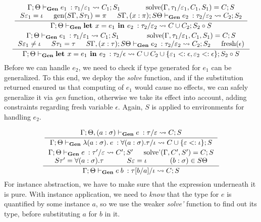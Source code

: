 \documentclass[declaration,shortabstract]{iithesis}
\theoremstyle{definition} \newtheorem{definition}{Definition}[section]
\newcommand{\gens}[6][\Gamma;\Theta]{\ensuremath{{{#1} \vdash_\textbf{Gen} {#2} \: : {#3}/{#4}} \rightsquigarrow {#5};{#6}}}
\newcommand{\lam}[1][x]{\ensuremath{\lambda #1.\:}}
\newcommand{\fresh}[1]{\ensuremath{\operatorname{fresh}({#1})}}
\begin{document}
\begin{gather*}
\inference{
    \gens{e_1}{\tau_1}{\varepsilon_1}{C_1}{S_1} &
    \operatorname{solve}(\Gamma,\tau_1/\varepsilon_1, C_1, S_1) =  C; S \\
    S \varepsilon_1 = \iota &
    \operatorname{gen}(S\Gamma, S\tau_1) = \pi &
    \gens[S\Gamma,(x:\pi);S\Theta]{e_2}{\tau_2}{\varepsilon_2}{C_2}{S_2}
}{
    \gens{\textbf{let } x = e_1 \textbf{ in } e_2}{\tau_2}{\varepsilon_2}{C\cup C_2}{S_2 \circ S}
}
\\
\inference{
    \gens{e_1}{\tau_1}{\varepsilon_1}{C_1}{S_1} &
    \operatorname{solve}(\Gamma,\tau_1/\varepsilon_1, C_1, S_1) =  C; S \\
    S \varepsilon_1 \neq \iota &
    S \tau_1 = \tau &
    \gens[S\Gamma,(x:\tau);S\Theta]{e_2}{\tau_2}{\varepsilon_2}{C_2}{S_2} &
    \fresh{\epsilon}
}{
    \gens{\textbf{let } x = e_1 \textbf{ in } e_2}{\tau_2}{\epsilon}{C\cup C_2
    \cup \{ \varepsilon_1 <: \epsilon, \varepsilon_2 <: \epsilon\}}{S_2 \circ S}
}
\end{gather*}
Before we can handle $e_2$, we need to check if type generated for $e_1$ can be generalized.
To this end, we deploy the \textit{solve} function, and if the substitution returned
ensured us that computing of $e_1$ would cause no effects, we can safely generalize it via \textit{gen} function,
otherwise we take its effect into account, adding constraints regarding fresh variable $\epsilon$.
Again, $S$ is applied to environments for handling $e_2$.

\begin{gather*}
\inference{
    \gens[\Gamma; \Theta, (a : \sigma)]{e}{\tau}{\varepsilon}{C}{S} \\
}{
    \gens{\lam[(a : \sigma)] e}{\forall (a : \sigma) . \tau}{\iota}{
        C \cup \{ \varepsilon <: \iota \}   
    }{S}
}
\\
\inference{
    \gens{e}{\tau'}{\varepsilon}{C'}{S'} &
    \operatorname{solve'}(\Gamma, C', S') = C; S  \\
    S \tau' = \forall (a : \sigma) . \tau &
    S \varepsilon = \iota &
    (b:\sigma) \in S\Theta
}{
    \gens{e\:b}{\tau[b/a]}{\iota}{C}{S}
}
\end{gather*}
For instance abstraction, we have to make sure that the expression underneath it is pure.
With instance application, we need to \textit{know} that the type for $e$ is quantified by some instance $a$,
so we use the weaker \textit{solve'} function to find out its type, before substituting $a$ for $b$ in it.
\end{document}
